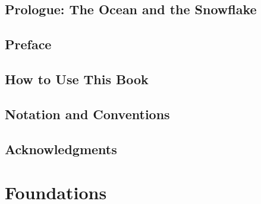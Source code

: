 \documentclass[11pt,letterpaper,openany]{book}
\begin{document}
\frontmatter









\chapter*{Prologue: The Ocean and the Snowflake}


\chapter*{Preface}


\chapter*{How to Use This Book}


\chapter*{Notation and Conventions}




\chapter*{Acknowledgments}


\tableofcontents
\listoffigures
\listoftables

\mainmatter

\part{Foundations}







\end{document}
